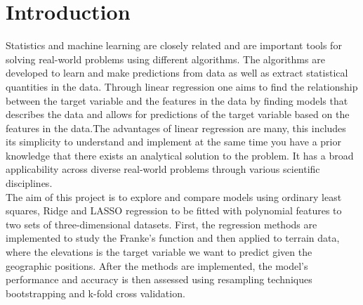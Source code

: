 \documentclass[a4paper,12pt]{article}
\title{\vspace{0cm}{\sc Project 1: Regression analysis and resampling methods \\ {\large FYS-STK4155 — Applied data analysis and machine learning }}}
\author{Jamal Sharifi  \\ \url{https://github.com/Jamshar} }
\begin{document}
\renewcommand{\figurename}{Fig.} 

\onecolumn

\maketitle

\begin{abstract}
\noindent
This project compares ordinary least squares, Ridge and LASSO regression algorithms in order to fit simulated data generated from Franke’s function and to fit real geographical data. Resampling techniques were used to estimate confidence intervals, bias-variance decomposition and assessing performance of predictive models, in order to identifying optimal parameters such as polynomial degree and penalty parameter $\lambda$. Ordinary least squares performed well with data of moderate size and low model complexity. For both simulated and real-world geographical data ordinary least squares was outperformed by Ridge and LASSO when dealing with overfitting.


\end{abstract}



\thispagestyle{empty}
\tableofcontents 




\section{Introduction}
Statistics and machine learning are closely related and are important tools for solving real-world problems using different algorithms. The algorithms are developed to learn and make predictions from data as well as extract statistical quantities in the data. Through linear regression one aims to find the relationship between the target variable and the features in the data by finding models that describes the data and allows for predictions of the target variable based on the features in the data.The advantages of linear regression are many, this includes its simplicity to understand and implement at the same time you have a prior knowledge that there exists an analytical solution to the problem. It has a broad applicability across diverse real-world problems through various scientific disciplines.\\

\noindent
The aim of this project is to explore and compare models using ordinary least squares, Ridge and LASSO regression to be fitted with polynomial features to two sets of three-dimensional datasets. First, the regression methods are implemented to study the Franke’s function and then applied to terrain data, where the elevations is the target variable we want to predict given the geographic positions. After the methods are implemented, the model’s performance and accuracy is then assessed using resampling techniques bootstrapping and k-fold cross validation.\\
\end{document}
